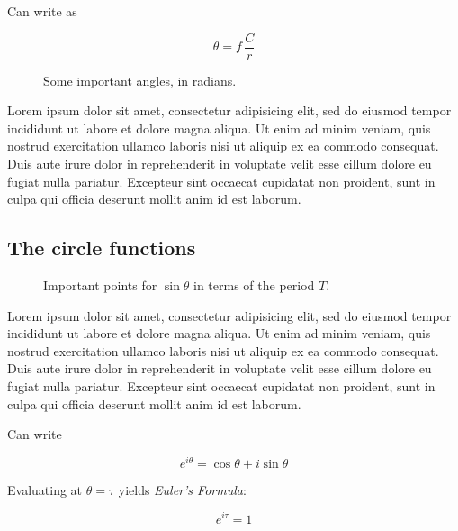 \documentclass{article}
\begin{document}
Can write as

\[ \theta = f\,\frac{C}{r} \]

\begin{figure}
\begin{center}
\end{center}
\caption{Some important angles, in radians.\label{fig:tau-angles}}
\end{figure}

Lorem ipsum dolor sit amet, consectetur adipisicing elit, sed do eiusmod tempor incididunt ut labore et dolore magna aliqua. Ut enim ad minim veniam, quis nostrud exercitation ullamco laboris nisi ut aliquip ex ea commodo consequat. Duis aute irure dolor in reprehenderit in voluptate velit esse cillum dolore eu fugiat nulla pariatur. Excepteur sint occaecat cupidatat non proident, sunt in culpa qui officia deserunt mollit anim id est laborum.

  \subsection{The circle functions} %
  \label{sec:the_circle_functions}

\begin{figure}
\begin{center}
\end{center}
\caption{Important points for $\sin\theta$ in terms of the period $T$.\label{fig:sine-with-tau}}
\end{figure}

Lorem ipsum dolor sit amet, consectetur adipisicing elit, sed do eiusmod tempor incididunt ut labore et dolore magna aliqua. Ut enim ad minim veniam, quis nostrud exercitation ullamco laboris nisi ut aliquip ex ea commodo consequat. Duis aute irure dolor in reprehenderit in voluptate velit esse cillum dolore eu fugiat nulla pariatur. Excepteur sint occaecat cupidatat non proident, sunt in culpa qui officia deserunt mollit anim id est laborum.
  


Can write

\[ e^{i\theta} = \cos\theta + i\sin\theta \]

Evaluating at $\theta = \tau$ yields \emph{Euler's Formula}:

\[ e^{i\tau} = 1 \]
\end{document}
